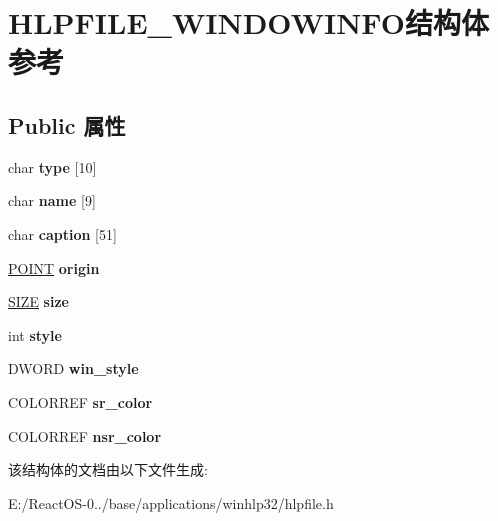 \hypertarget{struct_h_l_p_f_i_l_e___w_i_n_d_o_w_i_n_f_o}{}\section{H\+L\+P\+F\+I\+L\+E\+\_\+\+W\+I\+N\+D\+O\+W\+I\+N\+F\+O结构体 参考}
\label{struct_h_l_p_f_i_l_e___w_i_n_d_o_w_i_n_f_o}
\subsection*{Public 属性}
\begin{DoxyCompactItemize}
\item 
\mbox{\label{struct_h_l_p_f_i_l_e___w_i_n_d_o_w_i_n_f_o_a5da785e8d8b4e58d9fb85f345d9734c5}} 
char {\bfseries type} \mbox{[}10\mbox{]}
\item 
\mbox{\label{struct_h_l_p_f_i_l_e___w_i_n_d_o_w_i_n_f_o_a0ae9e24eb07adc16e2ad2f347378605d}} 
char {\bfseries name} \mbox{[}9\mbox{]}
\item 
\mbox{\label{struct_h_l_p_f_i_l_e___w_i_n_d_o_w_i_n_f_o_ada26979771ee40cbeccbfac7f6689410}} 
char {\bfseries caption} \mbox{[}51\mbox{]}
\item 
\mbox{\label{struct_h_l_p_f_i_l_e___w_i_n_d_o_w_i_n_f_o_a9d2ba617883a2d0da89d473c08c2880a}} 
\hyperlink{structtag_p_o_i_n_t}{P\+O\+I\+NT} {\bfseries origin}
\item 
\mbox{\label{struct_h_l_p_f_i_l_e___w_i_n_d_o_w_i_n_f_o_a78de67ad63116950e089c0ddc2530bc7}} 
\hyperlink{structtag_s_i_z_e}{S\+I\+ZE} {\bfseries size}
\item 
\mbox{\label{struct_h_l_p_f_i_l_e___w_i_n_d_o_w_i_n_f_o_a3bdb008cdc14534d4783f68723369655}} 
int {\bfseries style}
\item 
\mbox{\label{struct_h_l_p_f_i_l_e___w_i_n_d_o_w_i_n_f_o_a76ca3210f24bc4041ece30ef72ba87ba}} 
D\+W\+O\+RD {\bfseries win\+\_\+style}
\item 
\mbox{\label{struct_h_l_p_f_i_l_e___w_i_n_d_o_w_i_n_f_o_ad237954f8901ae645fd190fc16197571}} 
C\+O\+L\+O\+R\+R\+EF {\bfseries sr\+\_\+color}
\item 
\mbox{\label{struct_h_l_p_f_i_l_e___w_i_n_d_o_w_i_n_f_o_a71d112f233f97d3633f59c712c879f89}} 
C\+O\+L\+O\+R\+R\+EF {\bfseries nsr\+\_\+color}
\end{DoxyCompactItemize}


该结构体的文档由以下文件生成\+:\begin{DoxyCompactItemize}
\item 
E\+:/\+React\+O\+S-\/0../base/applications/winhlp32/hlpfile.\+h\end{DoxyCompactItemize}
